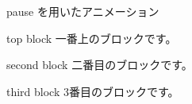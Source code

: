 \documentclass[dvipdfmx]{beamer}  %
\begin{document}
\begin{frame}{pause を用いたアニメーション}

  \begin{block}{top block}
    一番上のブロックです。
  \end{block}

  \pause
  \begin{block}{second block}
    二番目のブロックです。
  \end{block}

  \pause
  \begin{block}{third block}
    3番目のブロックです。
  \end{block}

\end{frame}
\end{document}
